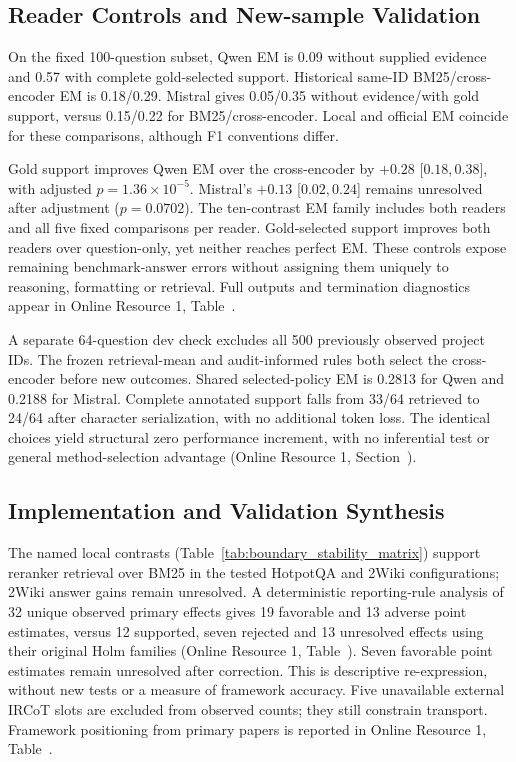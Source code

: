 \subsection{Reader Controls and New-sample Validation}
\label{sec:new_reader_controls_results}
On the fixed 100-question subset, Qwen EM is 0.09 without supplied evidence and 0.57 with complete gold-selected support. Historical same-ID BM25/cross-encoder EM is 0.18/0.29. Mistral gives 0.05/0.35 without evidence/with gold support, versus 0.15/0.22 for BM25/cross-encoder. Local and official EM coincide for these comparisons, although F1 conventions differ.

Gold support improves Qwen EM over the cross-encoder by $+0.28$ [$0.18,0.38$], with adjusted $p=1.36\times10^{-5}$. Mistral's $+0.13$ [$0.02,0.24$] remains unresolved after adjustment ($p=0.0702$). The ten-contrast EM family includes both readers and all five fixed comparisons per reader. Gold-selected support improves both readers over question-only, yet neither reaches perfect EM. These controls expose remaining benchmark-answer errors without assigning them uniquely to reasoning, formatting or retrieval. Full outputs and termination diagnostics appear in Online Resource 1, Table~.

A separate 64-question dev check excludes all 500 previously observed project IDs. The frozen retrieval-mean and audit-informed rules both select the cross-encoder before new outcomes. Shared selected-policy EM is 0.2813 for Qwen and 0.2188 for Mistral. Complete annotated support falls from 33/64 retrieved to 24/64 after character serialization, with no additional token loss. The identical choices yield structural zero performance increment, with no inferential test or general method-selection advantage (Online Resource 1, Section~).

\subsection{Implementation and Validation Synthesis}
\label{sec:implementation_validation_synthesis}

The named local contrasts (Table~\ref{tab:boundary_stability_matrix}) support reranker retrieval over BM25 in the tested HotpotQA and 2Wiki configurations; 2Wiki answer gains remain unresolved. A deterministic reporting-rule analysis of 32 unique observed primary effects gives 19 favorable and 13 adverse point estimates, versus 12 supported, seven rejected and 13 unresolved effects using their original Holm families (Online Resource 1, Table~). Seven favorable point estimates remain unresolved after correction. This is descriptive re-expression, without new tests or a measure of framework accuracy. Five unavailable external IRCoT slots are excluded from observed counts; they still constrain transport. Framework positioning from primary papers is reported in Online Resource 1, Table~.

